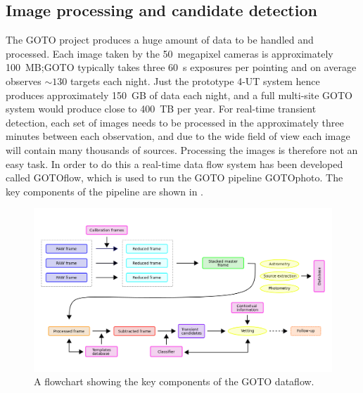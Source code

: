 \begin{colsection}
\newpage

\end{colsection}


\subsection{Image processing and candidate detection}
\label{sec:gotophoto}
\begin{colsection}

The GOTO project produces a huge amount of data to be handled and processed. Each image taken by the  50~megapixel cameras is approximately 100~MB;\@ GOTO typically takes three \SI{60}{\second} exposures per pointing and on average observes $\sim130$ targets each night. Just the prototype 4-UT system hence produces approximately 150~GB of data each night, and a full multi-site GOTO system would produce close to 400~TB per year. For real-time transient detection, each set of images needs to be processed in the approximately three minutes between each observation, and due to the wide field of view each image will contain many thousands of sources. Processing the images is therefore not an easy task. In order to do this a real-time data flow system has been developed called GOTOflow, which is used to run the GOTO pipeline GOTOphoto. The key components of the pipeline are shown in .

\begin{figure}[t]
    \begin{center}
        \includegraphics[width=\linewidth]{images/pipeline.png}
    \end{center}
    \caption[The GOTO dataflow]{
        A flowchart showing the key components of the GOTO dataflow.
    }\label{fig:gotoflow}
\end{figure}


\end{colsection}
